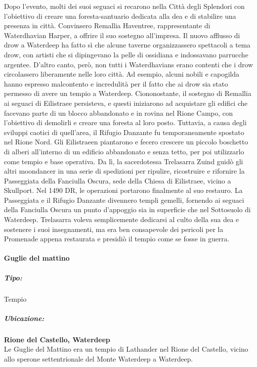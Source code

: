 \documentclass{article}
\begin{document}
                Dopo l'evento, molti dei suoi seguaci si recarono nella Città degli Splendori con l'obiettivo di creare una foresta-santuario dedicata alla dea e di stabilire una presenza in città. Convinsero Remallia Haventree, rappresentante di Waterdhavian Harper, a offrire il suo sostegno all'impresa. Il nuovo afflusso di drow a Waterdeep ha fatto sì che alcune taverne organizzassero spettacoli a tema drow, con artisti che si dipingevano la pelle di ossidiana e indossavano parrucche argentee. D'altro canto, però, non tutti i Waterdhavians erano contenti che i drow circolassero liberamente nelle loro città. Ad esempio, alcuni nobili e capogilda hanno espresso malcontento e incredulità per il fatto che ai drow sia stato permesso di avere un tempio a Waterdeep.
                Ciononostante, il sostegno di Remallia ai seguaci di Eilistraee persisteva, e questi iniziarono ad acquistare gli edifici che facevano parte di un blocco abbandonato e in rovina nel Rione Campo, con l'obiettivo di demolirli e creare una foresta al loro posto. Tuttavia, a causa degli sviluppi caotici di quell'area, il Rifugio Danzante fu temporaneamente spostato nel Rione Nord. Gli Eilistraeen piantarono e fecero crescere un piccolo boschetto di alberi all'interno di un edificio abbandonato e senza tetto, per poi utilizzarlo come tempio e base operativa. Da lì, la sacerdotessa Trelasarra Zuind guidò gli altri moondancer in una serie di spedizioni per ripulire, ricostruire e rifornire la Passeggiata della Fanciulla Oscura, sede della Chiesa di Eilistraee, vicino a Skullport. Nel 1490 DR, le operazioni portarono finalmente al suo restauro. La Passeggiata e il Rifugio Danzante divennero templi gemelli, fornendo ai seguaci della Fanciulla Oscura un punto d'appoggio sia in superficie che nel Sottosuolo di Waterdeep. Trelasarra voleva semplicemente dedicarsi al culto della sua dea e sostenere i suoi insegnamenti, ma era ben consapevole dei pericoli per la Promenade appena restaurata e presidiò il tempio come se fosse in guerra.
              \paragraph{Guglie del mattino}
              \subparagraph{Tipo:}Tempio
              \subparagraph{Ubicazione:}
              \textbf{Rione del Castello, Waterdeep}\\
              Le Guglie del Mattino era un tempio di Lathander nel Rione del Castello, vicino allo sperone settentrionale del Monte Waterdeep a Waterdeep.
              
\end{document}
